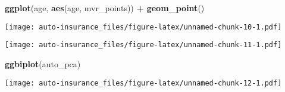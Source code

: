 \documentclass[]{article}
\newenvironment{Shaded}{\begin{snugshade}}{\end{snugshade}}
\newcommand{\KeywordTok}[1]{\textcolor[rgb]{0.13,0.29,0.53}{\textbf{#1}}}
\newcommand{\DataTypeTok}[1]{\textcolor[rgb]{0.13,0.29,0.53}{#1}}
\newcommand{\StringTok}[1]{\textcolor[rgb]{0.31,0.60,0.02}{#1}}
\newcommand{\OtherTok}[1]{\textcolor[rgb]{0.56,0.35,0.01}{#1}}
\newcommand{\OperatorTok}[1]{\textcolor[rgb]{0.81,0.36,0.00}{\textbf{#1}}}
\newcommand{\NormalTok}[1]{#1}
\begin{document}
\begin{Shaded}
\begin{Highlighting}[]
\KeywordTok{ggplot}\NormalTok{(age, }\KeywordTok{aes}\NormalTok{(age, mvr_points)) }\OperatorTok{+}\StringTok{ }\KeywordTok{geom_point}\NormalTok{()}
\end{Highlighting}
\end{Shaded}

\texttt{[image: auto-insurance\_files/figure-latex/unnamed-chunk-10-1.pdf]}

\begin{Shaded}
\end{Shaded}

\texttt{[image: auto-insurance\_files/figure-latex/unnamed-chunk-11-1.pdf]}

\begin{Shaded}
\begin{Highlighting}[]
\KeywordTok{ggbiplot}\NormalTok{(auto_pca)}
\end{Highlighting}
\end{Shaded}

\texttt{[image: auto-insurance\_files/figure-latex/unnamed-chunk-12-1.pdf]}
\end{document}
